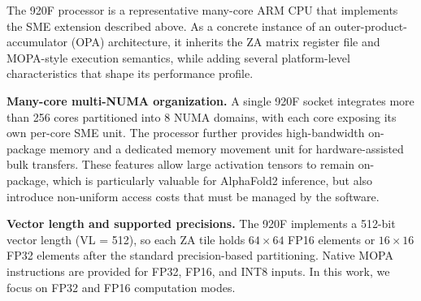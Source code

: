 The 920F processor is a representative many-core ARM CPU that implements the SME extension described above. As a concrete instance of an outer-product-accumulator (OPA) architecture, it inherits the ZA matrix register file and MOPA-style execution semantics, while adding several platform-level characteristics that shape its performance profile.

\textbf{Many-core multi-NUMA organization.} A single 920F socket integrates more than 256 cores partitioned into 8 NUMA domains, with each core exposing its own per-core SME unit. The processor further provides high-bandwidth on-package memory and a dedicated memory movement unit for hardware-assisted bulk transfers. These features allow large activation tensors to remain on-package, which is particularly valuable for AlphaFold2 inference, but also introduce non-uniform access costs that must be managed by the software.

\textbf{Vector length and supported precisions.} The 920F implements a 512-bit vector length (VL = 512), so each ZA tile holds $64 \times 64$ FP16 elements or $16 \times 16$ FP32 elements after the standard precision-based partitioning. Native MOPA instructions are provided for FP32, FP16, and INT8 inputs. In this work, we focus on FP32 and FP16 computation modes.





